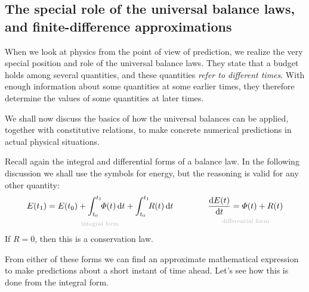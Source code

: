 \documentclass[a4paper,12pt,%
onecolumn,oneside,%
british%
]{memoir}
\newcommand*{\di}{\mathrm{d}}%
\renewcommand*{\|}[1][]{\nonscript\:#1\vert\nonscript\:\mathopen{}}
\newcommand*{\yti}{t_{0}}
\newcommand*{\ytf}{t_{1}}
\newcommand*{\yE}{E}
\newcommand*{\yH}{\varPhi}%
\newcommand*{\yR}{R}%
\begin{document}
\subsection{The special role of the universal balance laws, and finite-difference approximations}
\label{sec:forecast_balances}

When we look at physics from the point of view of prediction, we realize the very special position and role of the universal balance laws. They state that a budget holds among several quantities, and these quantities \emph{refer to different times}. With enough information about some quantities at some earlier times, they therefore determine the values of some quantities at later times.

We shall now discuss the basics of how the universal balances can be applied, together with constitutive relations, to make concrete numerical predictions in actual physical situations.

\medskip


Recall again the integral and differential forms of a balance law. In the following discussion we shall use the symbols for energy, but the reasoning is valid for any other quantity:
\begin{equation*}
      \underbracket[0pt]{\yE(\ytf) = \yE(\yti) + \int_{\yti}^{\ytf}\!\!\yH(t)\,\di t + \int_{\yti}^{\ytf}\!\!\yR(t)\,\di t}_{\mathclap{\text{\color{grey}integral form}}}
      \qquad%
      \qquad
      \underbracket[0pt]{\frac{\di\yE(t)}{\di t} = \yH(t) + \yR(t)}_{\mathclap{\text{\color{grey}differential form}}}
\end{equation*}
If $\yR=0$, then this is a conservation law.

From either of these forms we can find an approximate mathematical expression to make predictions about a short instant of time ahead. Let's see how this is done from the integral form.
\end{document}
